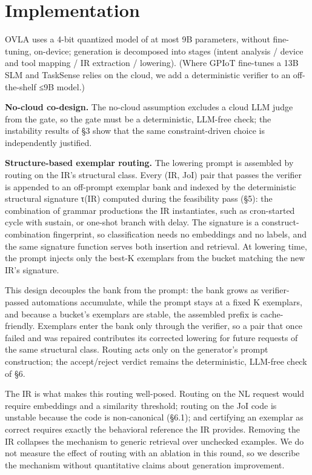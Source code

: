 \documentclass[sigconf,nonacm,anonymous,review]{acmart}
\begin{document}
\section{Implementation}

OVLA uses a 4-bit quantized model of at most 9B parameters, without fine-tuning, on-device; generation is decomposed into stages (intent analysis / device and tool mapping / IR extraction / lowering). (Where GPIoT fine-tunes a 13B SLM and TaskSense relies on the cloud, we add a deterministic verifier to an off-the-shelf ≤9B model.)

\textbf{No-cloud co-design.} The no-cloud assumption excludes a cloud LLM judge from the gate, so the gate must be a deterministic, LLM-free check; the instability results of \S3 show that the same constraint-driven choice is independently justified.

\textbf{Structure-based exemplar routing.} The lowering prompt is assembled by routing on the IR's structural class. Every (IR, JoI) pair that passes the verifier is appended to an off-prompt exemplar bank and indexed by the deterministic structural signature τ(IR) computed during the feasibility pass (\S5): the combination of grammar productions the IR instantiates, such as cron-started cycle with sustain, or one-shot branch with delay. The signature is a construct-combination fingerprint, so classification needs no embeddings and no labels, and the same signature function serves both insertion and retrieval. At lowering time, the prompt injects only the best-K exemplars from the bucket matching the new IR's signature.

This design decouples the bank from the prompt: the bank grows as verifier-passed automations accumulate, while the prompt stays at a fixed K exemplars, and because a bucket's exemplars are stable, the assembled prefix is cache-friendly. Exemplars enter the bank only through the verifier, so a pair that once failed and was repaired contributes its corrected lowering for future requests of the same structural class. Routing acts only on the generator's prompt construction; the accept/reject verdict remains the deterministic, LLM-free check of \S6.

The IR is what makes this routing well-posed. Routing on the NL request would require embeddings and a similarity threshold; routing on the JoI code is unstable because the code is non-canonical (\S6.1); and certifying an exemplar as correct requires exactly the behavioral reference the IR provides. Removing the IR collapses the mechanism to generic retrieval over unchecked examples. We do not measure the effect of routing with an ablation in this round, so we describe the mechanism without quantitative claims about generation improvement.
\end{document}
